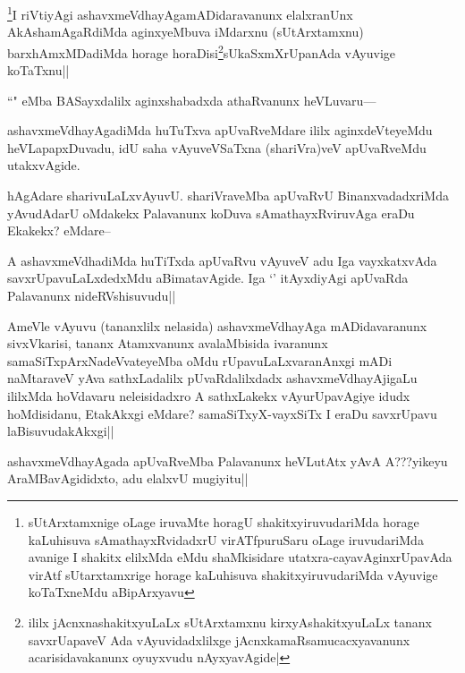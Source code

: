 \begin{artha}
\footnote{sUtArxtamxnige oLage iruvaMte horagU shakitxyiruvudariMda horage kaLuhisuva sAmathayxRvidadxrU virATfpuruSaru oLage iruvudariMda avanige I shakitx elilxMda eMdu shaMkisidare utatxra-cayavAginxrUpavAda virAtf sUtarxtamxrige horage kaLuhisuva shakitxyiruvudariMda vAyuvige koTaTxneMdu aBipArxyavu}I riVtiyAgi ashavxmeVdhayAgamADidaravanunx elalxranUnx AkAshamAgaRdiMda aginxyeMbuva iMdarxnu (sUtArxtamxnu) barxhAmxMDadiMda horage horaDisi\footnote{ililx jAcnxnashakitxyuLaLx sUtArxtamxnu kirxyAshakitxyuLaLx tananx savxrUapaveV Ada vAyuvidadxlilxge jAcnxkamaRsamucacxyavanunx acarisidavakanunx oyuyxvudu nAyxyavAgide|}sUkaSxmXrUpanAda vAyuvige koTaTxnu||
\end{artha}

\begin{artha}
``\stext" eMba BASayxdalilx aginxshabadxda athaRvanunx heVLuvaru---
\end{artha}

\begin{artha}
ashavxmeVdhayAgadiMda huTuTxva apUvaRveMdare ililx aginxdeVteyeMdu heVLapapxDuvadu, idU saha vAyuveVSaTxna (shariVra)veV apUvaRveMdu utakxvAgide.
\end{artha}

\begin{artha}
hAgAdare sharivuLaLxvAyuvU. shariVraveMba apUvaRvU BinanxvadadxriMda yAvudAdarU oMdakekx Palavanunx koDuva sAmathayxRviruvAga eraDu Ekakekx? eMdare--
\end{artha}

\begin{artha}
A ashavxmeVdhadiMda huTiTxda apUvaRvu vAyuveV adu Iga vayxkatxvAda savxrUpavuLaLxdedxMdu aBimatavAgide. Iga `\stext' itAyxdiyAgi apUvaRda Palavanunx nideRVshisuvudu||
\end{artha}

\begin{artha}
AmeVle vAyuvu (tananxlilx nelasida) ashavxmeVdhayAga mADidavaranunx sivxVkarisi, tananx Atamxvanunx avalaMbisida ivaranunx samaSiTxpArxNadeVvateyeMba oMdu rUpavuLaLxvaranAnxgi mADi naMtaraveV yAva sathxLadalilx pUvaRdalilxdadx ashavxmeVdhayAjigaLu ililxMda hoVdavaru neleisidadxro A sathxLakekx vAyurUpavAgiye idudx hoMdisidanu, EtakAkxgi eMdare? samaSiTxyX-vayxSiTx I eraDu savxrUpavu laBisuvudakAkxgi||
\end{artha}

\begin{artha}
ashavxmeVdhayAgada apUvaRveMba Palavanunx heVLutAtx yAvA A???yikeyu AraMBavAgididxto, adu elalxvU mugiyitu||
\end{artha}

